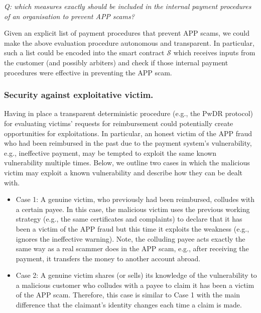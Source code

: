   \begin{center}\textit{Q: which measures exactly should be included in the internal payment procedures of an organisation to prevent  APP scams?}
 \end{center}
 
Given an explicit list of payment procedures  that  prevent  APP scams,  we could make the above evaluation procedure autonomous and transparent. In particular, such a list could be encoded into the  smart contract $\mathcal{S}$ which receives inputs from the customer (and possibly arbiters) and check if those internal payment procedures were effective in preventing the APP scam. 


\subsubsection{Security against exploitative victim.}

Having in place a transparent deterministic procedure (e.g.,  the PwDR protocol)  for evaluating victims' requests for reimbursement  could potentially create opportunities for exploitations. In particular, an honest victim  of the APP fraud who had been reimbursed in the past due to the payment system's vulnerability, e.g., ineffective payment, may be tempted to  exploit the same  known vulnerability multiple times.  Below, we outline two cases in which the malicious victim may exploit a known vulnerability and describe how they can be dealt with.  

\begin{itemize}
\item Case 1: A genuine victim, who  previously had been reimbursed,  colludes with a certain payee. In this case, the malicious victim uses the previous working strategy (e.g., the same certificates and complaints) to declare that it has been a victim of the APP fraud but this time it  exploits the weakness (e.g., ignores the ineffective warning). Note, the colluding payee acts exactly the same way as a real scammer does in the APP scam, e.g., after receiving the payment, it transfers the money to another account abroad. 


\item Case 2: A genuine victim shares (or sells) its knowledge of the vulnerability to a  malicious customer who colludes with a payee to claim it has been a victim of the APP scam. Therefore, this case is similar to Case 1 with the main difference that the claimant's  identity  changes each time a claim is made. %
\end{itemize}


